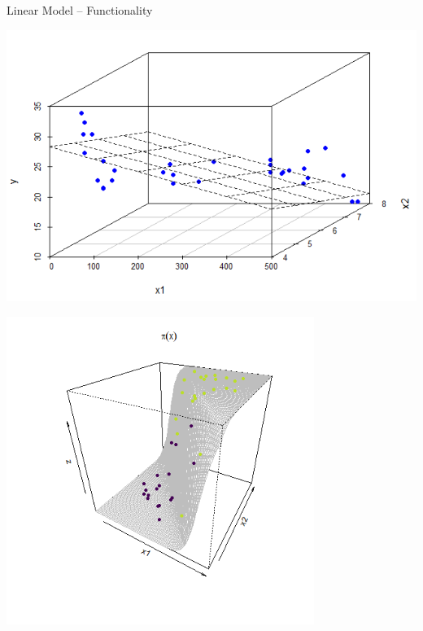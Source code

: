 \documentclass[11pt,compress,t,notes=noshow, xcolor=table]{beamer}
\begin{document}
\begin{frame}{Linear Model -- Functionality}
\begin{itemize}
\end{itemize}



\footnotesize

\begin{minipage}{0.32\textwidth}
  \includegraphics[width=1.05\textwidth]{figure/linreg-surface.png}
\end{minipage}
 \normalsize 
\begin{minipage}{0.42\textwidth}
  \begin{center}
  \includegraphics[width=0.75\textwidth]{figure/logreg-2vars-surface.png}

\end{center}
\end{minipage}
\end{frame}
\end{document}
